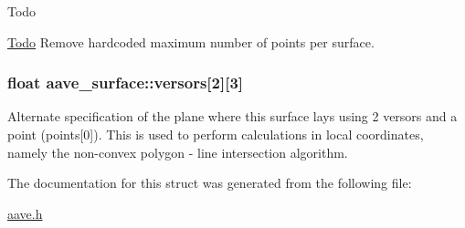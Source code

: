 \begin{DoxyRefDesc}{Todo}
\item[\hyperlink{todo__todo000004}{Todo}]Remove hardcoded maximum number of points per surface. \end{DoxyRefDesc}
\hypertarget{structaave__surface_a8724b22799063ed44d691a845f68f768}{
\subsubsection[{versors}]{\setlength{\rightskip}{0pt plus 5cm}float aave\-\_\-surface\-::versors\mbox{[}2\mbox{]}\mbox{[}3\mbox{]}}}\label{structaave__surface_a8724b22799063ed44d691a845f68f768}
Alternate specification of the plane where this surface lays using 2 versors and a point (points\mbox{[}0\mbox{]}). This is used to perform calculations in local coordinates, namely the non-\/convex polygon -\/ line intersection algorithm. 

The documentation for this struct was generated from the following file\-:\begin{DoxyCompactItemize}
\item 
\hyperlink{aave_8h}{aave.\-h}\end{DoxyCompactItemize}
